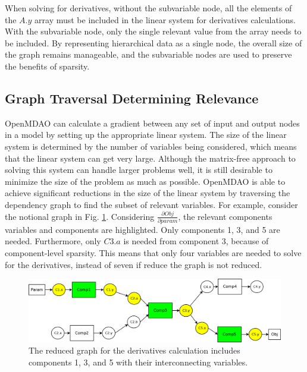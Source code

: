 \documentclass[]{aiaa-tc} %
\begin{document}
    When solving for derivatives, without the subvariable node, all the
    elements of the $A.y$ array must be included in the linear system for derivatives calculations.
    With the subvariable node, only the single relevant value from the array needs to be included.
    By representing hierarchical data as a single node, the overall size of the graph
    remains manageable, and the subvariable nodes are used to preserve the benefits of sparsity.


    \subsection{Graph Traversal Determining Relevance}

        OpenMDAO can calculate a gradient between any set of input and output nodes in a  
        model by setting up the appropriate linear system. The size of the linear system
        is determined by the number of variables being considered, which means that the linear
        system can get very large. Although the matrix-free approach to solving this system 
        can handle larger problems well, it is still desirable to minimize the size of the problem 
        as much as possible. OpenMDAO is able to achieve significant reductions in the
        size of the linear system by traversing the dependency graph to find the subset of relevant variables.
        For example, consider the notional graph in Fig. \ref{fig:graph2}. Considering $\frac{\partial Obj}{\partial param}$,
        the relevant components variables and components are highlighted. Only components 1, 3, and 5 are needed.
        Furthermore, only $C3.a$ is needed from component 3, because of component-level sparsity. 
        This means that only four variables are needed to solve for the derivatives, 
        instead of seven if reduce the graph is not reduced. 

        \begin{figure}[!htb]\begin{center}
          \includegraphics[width=.8\textwidth]{images/Graph2}
          \caption{ The reduced graph for the derivatives calculation includes components 1, 3,
          and 5 with their interconnecting variables. \label{fig:graph2}}
        \end{center}\end{figure}
\end{document}
